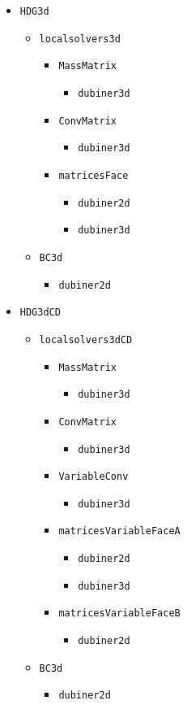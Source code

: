 \documentclass[10pt,english]{article}
\begin{document}
\begin{itemize}
\item {\tt HDG3d}
\begin{itemize}
\item {\tt localsolvers3d}
\begin{itemize}
\item {\tt MassMatrix}
\begin{itemize}
\item {\tt dubiner3d}
\end{itemize}
\item {\tt ConvMatrix}
\begin{itemize}
\item {\tt dubiner3d}
\end{itemize}
\item {\tt matricesFace}
\begin{itemize}
\item {\tt dubiner2d}
\item {\tt dubiner3d}
\end{itemize}
\end{itemize}
\item {\tt BC3d}
\begin{itemize}
\item {\tt dubiner2d}
\end{itemize}
\end{itemize}
\item {\tt HDG3dCD}
\begin{itemize}
\item {\tt localsolvers3dCD}
\begin{itemize}
\item {\tt MassMatrix}
\begin{itemize}
\item {\tt dubiner3d}
\end{itemize}
\item {\tt ConvMatrix}
\begin{itemize}
\item {\tt dubiner3d}
\end{itemize}
\item {\tt VariableConv}
\begin{itemize}
\item {\tt dubiner3d}
\end{itemize}
\item {\tt matricesVariableFaceA}
\begin{itemize}
\item {\tt dubiner2d}
\item {\tt dubiner3d}
\end{itemize}
\item {\tt matricesVariableFaceB}
\begin{itemize}
\item {\tt dubiner2d}
\end{itemize}
\end{itemize}
\item {\tt BC3d}
\begin{itemize}
\item {\tt dubiner2d}
\end{itemize}
\end{itemize}
\end{itemize}
\end{document}
